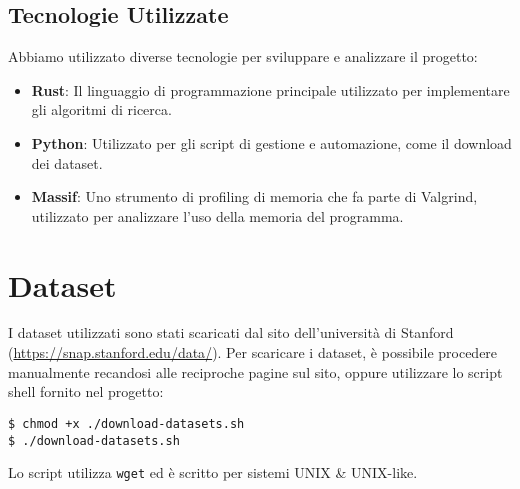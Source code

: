 \documentclass{article}
\begin{document}
\subsection{Tecnologie Utilizzate}
Abbiamo utilizzato diverse tecnologie per sviluppare e analizzare il progetto:
\begin{itemize}
  \item \textbf{Rust}: Il linguaggio di programmazione principale utilizzato per implementare gli algoritmi di ricerca.
  \item \textbf{Python}: Utilizzato per gli script di gestione e automazione, come il download dei dataset.
  \item \textbf{Massif}: Uno strumento di profiling di memoria che fa parte di Valgrind, utilizzato per analizzare l'uso della memoria del programma.
\end{itemize}

\section{Dataset}
I dataset utilizzati sono stati scaricati dal sito dell'università di Stanford (\url{https://snap.stanford.edu/data/}).
Per scaricare i dataset, è possibile procedere manualmente recandosi alle reciproche pagine sul sito, oppure utilizzare lo script shell fornito nel progetto:
\begin{verbatim}
$ chmod +x ./download-datasets.sh
$ ./download-datasets.sh
\end{verbatim}
Lo script utilizza \texttt{wget} ed è scritto per sistemi UNIX \& UNIX-like.
\end{document}
